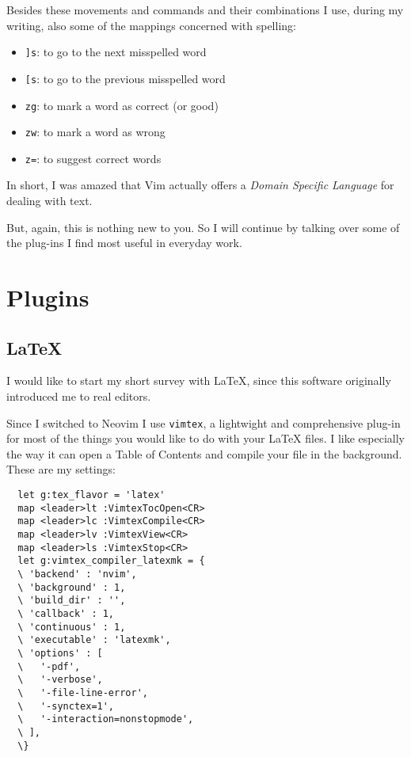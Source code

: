 \documentclass[DIV=calc, a4paper, fontsize=12pt, headings=normal, parskip=half]{scrartcl}
\begin{document}
Besides these movements and commands and their combinations I use,
during my writing, also some of the mappings concerned with spelling:

\begin{itemize}[noitemsep]
\tightlist
\item
  \texttt{{]}s}: to go to the next misspelled word
\item
  \texttt{{[}s}: to go to the previous misspelled word
\item
  \texttt{zg}: to mark a word as correct (or good)
\item
  \texttt{zw}: to mark a word as wrong
\item
  \texttt{z=}: to suggest correct words
\end{itemize}

In short, I was amazed that Vim actually offers a \emph{Domain Specific
Language} for dealing with text.

But, again, this is nothing new to you. So I will continue by talking
over some of the plug-ins I find most useful in everyday work.

\section{Plugins}\label{plugins}

\subsection{LaTeX}\label{latex}

I would like to start my short survey with LaTeX, since this software
originally introduced me to real editors.

Since I switched to Neovim I use \texttt{vimtex}, a lightwight and
comprehensive plug-in for most of the things you would like to do with
your LaTeX files. I like especially the way it can open a Table of
Contents and compile your file in the background. These are my settings:
\begin{singlespace}
  \begin{verbatim}
  let g:tex_flavor = 'latex'
  map <leader>lt :VimtexTocOpen<CR>
  map <leader>lc :VimtexCompile<CR>
  map <leader>lv :VimtexView<CR>
  map <leader>ls :VimtexStop<CR>
  let g:vimtex_compiler_latexmk = {
  \ 'backend' : 'nvim',
  \ 'background' : 1,
  \ 'build_dir' : '',
  \ 'callback' : 1,
  \ 'continuous' : 1,
  \ 'executable' : 'latexmk',
  \ 'options' : [
  \   '-pdf',
  \   '-verbose',
  \   '-file-line-error',
  \   '-synctex=1',
  \   '-interaction=nonstopmode',
  \ ],
  \}
  \end{verbatim}
\end{singlespace}
\end{document}
